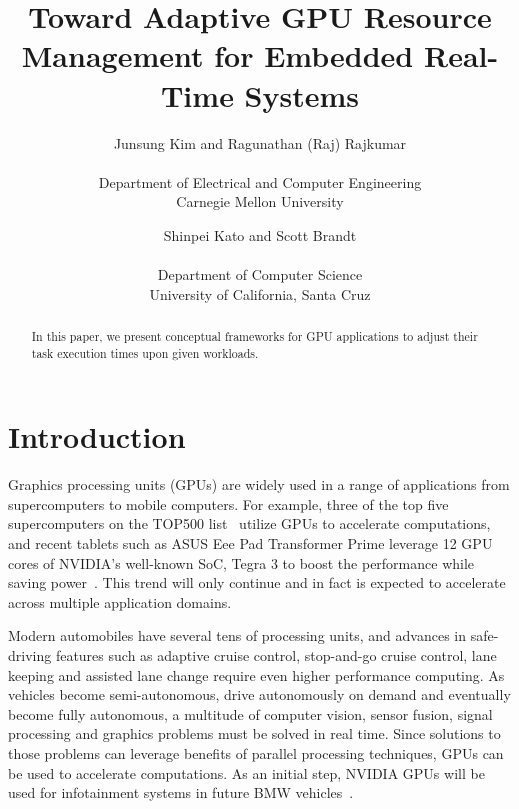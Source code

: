 \documentclass[times, 10pt, twocolumn]{article}
\begin{document}
\title{
Toward Adaptive GPU Resource Management for Embedded Real-Time Systems
}

\author {
Junsung Kim and Ragunathan (Raj) Rajkumar\\
\\
Department of Electrical and Computer Engineering\\
Carnegie Mellon University
\and
Shinpei Kato and Scott Brandt\\
\\
Department of Computer Science\\
University of California, Santa Cruz
}

\maketitle

\thispagestyle{empty}

\begin{abstract}
 In this paper, we present conceptual frameworks for GPU applications to
 adjust their task execution times upon given workloads.
\end{abstract}

\section{Introduction}
\label{sec:introduction}
Graphics processing units (GPUs) are widely used in a range of applications from supercomputers to mobile computers. For example, three of the top five supercomputers on the TOP500 list~\cite{TOP500} utilize GPUs to accelerate computations, and recent tablets such as ASUS Eee Pad Transformer Prime leverage 12 GPU cores of NVIDIA’s well-known SoC, Tegra 3 to boost the performance while saving power~\cite{Tegra3}. This trend will only continue and in fact is expected to accelerate across multiple application domains. 

Modern automobiles have several tens of processing units, and advances in safe-driving features such as adaptive cruise control, stop-and-go cruise control, lane keeping and assisted lane change require even higher performance computing. As vehicles become semi-autonomous, drive autonomously on demand and eventually become fully autonomous, a multitude of computer vision, sensor fusion, signal processing and graphics problems must be solved in real time. Since solutions to those problems can leverage benefits of parallel processing techniques, GPUs can be used to accelerate computations. As an initial step, NVIDIA GPUs will be used for infotainment systems in future BMW vehicles~\cite{NVIDIA_BMW}.
\end{document}
